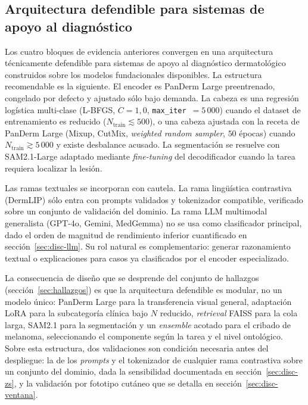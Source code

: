 \subsection{Arquitectura defendible para sistemas de apoyo al diagnóstico}
\label{sec:disc-arq}

Los cuatro bloques de evidencia anteriores convergen en una
arquitectura técnicamente defendible para sistemas de apoyo al
diagnóstico dermatológico construidos sobre los modelos
fundacionales disponibles. La estructura recomendable es la
siguiente. El encoder es PanDerm Large preentrenado, congelado por
defecto y ajustado sólo bajo demanda. La cabeza es una regresión
logística multi-clase (L-BFGS, $C=1{,}0$,
\texttt{max\_iter}~$=5\,000$) cuando el dataset de entrenamiento es
reducido ($N_{\mathrm{train}} \lesssim 500$), o una cabeza
ajustada con la receta de PanDerm Large (Mixup, CutMix,
\emph{weighted random sampler}, $50$ épocas) cuando
$N_{\mathrm{train}} \gtrsim 5\,000$ y existe desbalance acusado.
La segmentación se resuelve con SAM2.1-Large adaptado mediante
\emph{fine-tuning} del decodificador cuando la tarea requiera
localizar la lesión.

Las ramas textuales se incorporan con cautela. La rama lingüística
contrastiva (DermLIP) sólo entra con prompts validados y tokenizador
compatible, verificado sobre un conjunto de validación del dominio.
La rama LLM multimodal generalista (GPT-4o, Gemini, MedGemma) no se
usa como clasificador principal, dado el orden de magnitud de
rendimiento inferior cuantificado en sección~\ref{sec:disc-llm}.
Su rol natural es complementario: generar razonamiento textual o
explicaciones para casos ya clasificados por el encoder
especializado.

La consecuencia de diseño que se desprende del conjunto de hallazgos
(sección~\ref{sec:hallazgos}) es que la arquitectura defendible es
modular, no un modelo único: PanDerm Large para la transferencia visual
general, adaptación LoRA para la subcategoría clínica bajo $N$ reducido,
\emph{retrieval} FAISS para la cola larga, SAM2.1 para la segmentación y
un \emph{ensemble} acotado para el cribado de melanoma, seleccionando el
componente según la tarea y el nivel ontológico. Sobre esta estructura,
dos validaciones son condición necesaria antes del despliegue: la de los
\emph{prompts} y el tokenizador de cualquier rama contrastiva sobre un
conjunto del dominio, dada la sensibilidad documentada en
sección~\ref{sec:disc-zs}, y la validación por fototipo cutáneo que se
detalla en sección~\ref{sec:disc-ventana}.


